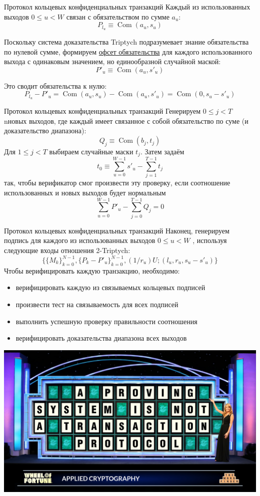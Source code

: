 \documentclass[aspectratio=169]{beamer}
\newcommand{\com}{\operatorname{Com}}
\begin{document}
\begin{frame}{Протокол кольцевых конфиденциальных транзакций}
Каждый из использованных выходов $0 \leq u < W$ связан с обязательством по сумме $a_u$:
$$P_{l_u} \equiv \com(a_u,s_u)$$

Поскольку система доказательства Triptych подразумевает знание обязательства по нулевой сумме, формируем \underline{офсет обязательства} для каждого использованного выхода с одинаковым значением, но единообразной случайной маской:
$$P'_u \equiv \com(a_u,s'_u)$$

Это сводит обязательства к нулю:
$$P_{l_u} - P'_u = \com(a_u,s_u) - \com(a_u,s'_u) = \com(0,s_u-s'_u)$$
\end{frame}


\begin{frame}{Протокол кольцевых конфиденциальных транзакций}
Генерируем $0 \leq j < T$ nновых выходов, где каждый имеет связанное с собой обязательство по суме (и доказательство диапазона):
$$Q_j \equiv \com(b_j,t_j)$$
Для $1 \leq j < T$ выбираем случайные маски $t_j$. Затем задаём
$$t_0 \equiv \sum_{u=0}^{W-1} s'_u - \sum_{j=1}^{T-1} t_j$$
так, чтобы верификатор смог произвести эту проверку, если соотношение использованных и новых выходов будет нормальным
$$\sum_{u=0}^{W-1} P'_u - \sum_{j=0}^{T-1} Q_j = 0$$
\end{frame}


\begin{frame}{Протокол кольцевых конфиденциальных транзакций}
Наконец, генерируем подпись для каждого из использованных выходов $0 \leq u < W$ , используя следующие входы отношения 2-Triptych:
$$\Big\{\{M_k\}_{k=0}^{N-1},\{P_k-P'_u\}_{k=0}^{N-1},(1/r_u)U; (l_u,r_u,s_u-s'_u)\Big\}$$
Чтобы верифицировать каждую транзакцию, необходимо:
\begin{itemize}
\item верифицировать каждую из связываемых кольцевых подписей
\item произвести тест на связываемость для всех подписей
\item выполнить успешную проверку правильности соотношения
\item верифицировать доказательства диапазона всех выходов
\end{itemize}
\end{frame}


\begin{frame}
\centering
\includegraphics[width=\textwidth]{protocol.jpeg}
\end{frame}
\end{document}
